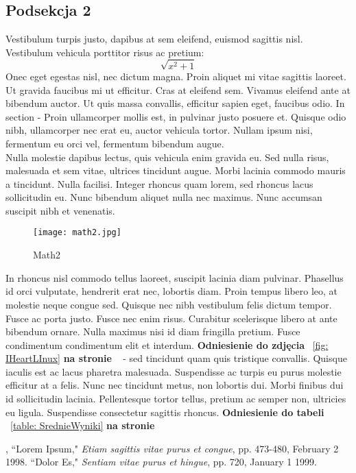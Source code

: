 \documentclass[12pt,a4paper]{article}
\begin{document}
	
	\subsection{Podsekcja 2}
	Vestibulum turpis justo, dapibus at sem eleifend, euismod sagittis nisl. Vestibulum vehicula porttitor risus ac pretium:
	\[\sqrt{x^2+1}\] 
	Onec eget egestas nisl, nec dictum magna. Proin aliquet mi vitae sagittis laoreet. Ut gravida faucibus mi ut efficitur. Cras at eleifend sem. Vivamus eleifend ante at bibendum auctor. Ut quis massa convallis, efficitur sapien eget, faucibus odio.
	In section  - Proin ullamcorper mollis est, in pulvinar justo posuere et. Quisque odio nibh, ullamcorper nec erat eu, auctor vehicula tortor. Nullam ipsum nisi, fermentum eu orci vel, fermentum bibendum augue.
	\\Nulla molestie dapibus lectus, quis vehicula enim gravida eu. Sed nulla risus, malesuada et sem vitae, ultrices tincidunt augue. Morbi lacinia commodo mauris a tincidunt. Nulla facilisi. Integer rhoncus quam lorem, sed rhoncus lacus sollicitudin eu. Nunc bibendum aliquet nulla nec maximus. Nunc accumsan suscipit nibh et venenatis. 
	\begin{figure}[H]
		\centering
		\texttt{[image: math2.jpg]}
		\caption{Math2}
		\label{fig: Math2}
	\end{figure}

	In rhoncus nisl commodo tellus laoreet, suscipit lacinia diam pulvinar. Phasellus id orci vulputate, hendrerit erat nec, lobortis diam. Proin tempus libero leo, at molestie neque congue sed. Quisque nec nibh vestibulum felis dictum tempor. Fusce ac porta justo. Fusce nec enim risus. Curabitur scelerisque libero at ante bibendum ornare. Nulla maximus nisi id diam fringilla pretium. Fusce condimentum condimentum elit et interdum. \textbf{Odniesienie do zdjęcia} ~\ref{fig: IHeartLInux} \textbf{na stronie} ~\pageref{fig: IHeartLInux} - sed tincidunt quam quis tristique convallis.
	Quisque iaculis est ac lacus pharetra malesuada. Suspendisse ac turpis eu purus molestie efficitur at a felis. Nunc nec tincidunt metus, non lobortis dui. Morbi finibus dui id sollicitudin lacinia. Pellentesque tortor tellus, pretium ac semper non, ultricies eu ligula. Suspendisse consectetur sagittis rhoncus. \textbf{Odniesienie do tabeli} ~\ref{table: SrednieWyniki} \textbf{na stronie} ~\pageref{table: SrednieWyniki}
	
	\newpage
	\begin{thebibliography}{10}
		, ``Lorem Ipsum," \emph{Etiam sagittis vitae purus et congue}, pp. 473-480, February 2 1998.
		``Dolor Es," \emph{Sentiam vitae purus et hingue}, pp. 720, January 1 1999.
	\end{thebibliography}
	
\end{document}
